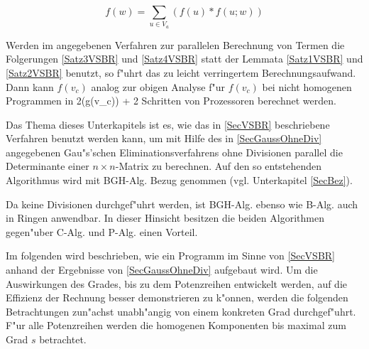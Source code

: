 \begin{korollar}
\label{Satz4VSBR}
    \[
       f(w) = 
           \sum_{u\in V_a} (f(u) * f(u;w))
    \]
\end{korollar}

Werden im angegebenen Verfahren zur parallelen Berechnung von Termen 
die Folgerungen
\ref{Satz3VSBR} und \ref{Satz4VSBR} statt der Lemmata \ref{Satz1VSBR} und
\ref{Satz2VSBR} benutzt, so f"uhrt das zu leicht verringertem
Berechnungsaufwand. Dann kann $f(v_c)$ analog zur obigen Analyse 
f"ur $f(v_c)$ bei nicht homogenen Programmen in
        2\lc \log(g(v_c)) \rc
        \lb \lc \log \lb {} 
                     \rb 
             \rc + 2
        \rb
\Eeq Schritten von 
\Eeq Prozessoren berechnet werden.


\label{SecAlgBGH}

Das Thema dieses Unterkapitels ist es, wie das in \ref{SecVSBR}
beschriebene Verfahren benutzt werden kann, um mit Hilfe des in
\ref{SecGaussOhneDiv} angegebenen
Gau"s'schen Eliminationsverfahrens ohne Divisionen parallel die
Determinante einer $n \times n$-Matrix zu berechnen. Auf den so
entstehenden Algorithmus wird mit BGH-Alg. Bezug genommen
(vgl. Unterkapitel \ref{SecBez}).

Da keine Divisionen durchgef"uhrt werden, ist BGH-Alg. ebenso wie
B-Alg. auch in Ringen anwendbar. In dieser Hinsicht besitzen die
beiden Algorithmen gegen"uber C-Alg. und P-Alg. einen Vorteil.

Im folgenden wird beschrieben, wie ein Programm im Sinne von
\ref{SecVSBR} anhand der Ergebnisse von \ref{SecGaussOhneDiv}
aufgebaut wird. Um die Auswirkungen des Grades, bis zu dem Potenzreihen
entwickelt werden, auf die Effizienz der Rechnung besser demonstrieren 
zu k"onnen, werden die folgenden Betrachtungen zun"achst unabh"angig von
einem konkreten Grad durchgef"uhrt. F"ur alle Potenzreihen werden
die homogenen Komponenten bis maximal zum Grad $s$ betrachtet.

